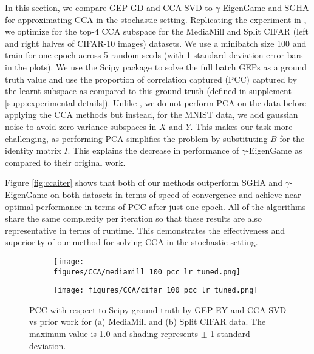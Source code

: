 In this section, we compare GEP-GD and CCA-SVD to $\gamma$-EigenGame \cite{gemp2022generalized} and SGHA \cite{chen2019constrained} for approximating CCA in the stochastic setting. Replicating the experiment in \cite{meng2021online, gemp2022generalized}, we optimize for the top-4 CCA subspace for the MediaMill and Split CIFAR (left and right halves of CIFAR-10 images) datasets. We use a minibatch size 100 and train for one epoch across 5 random seeds (with 1 standard deviation error bars in the plots). We use the Scipy \cite{virtanen2020scipy} package to solve the full batch GEPs as a ground truth value and use the proportion of correlation captured (PCC) captured by the learnt subspace as compared to this ground truth (defined in supplement \ref{supp:experimental details}). Unlike \cite{gemp2022generalized}, we do not perform PCA on the data before applying the CCA methods but instead, for the MNIST data, we add gaussian noise to avoid zero variance subspaces in $X$ and $Y$. This makes our task more challenging, as performing PCA simplifies the problem by substituting $B$ for the identity matrix $I$. This explains the decrease in performance of $\gamma$-EigenGame as compared to their original work.

Figure \ref{fig:ccaiter} shows that both of our methods outperform SGHA and $\gamma$-EigenGame on both datasets in terms of speed of convergence and achieve near-optimal performance in terms of PCC after just one epoch. All of the algorithms share the same complexity per iteration so that these results are also representative in terms of runtime. This demonstrates the effectiveness and superiority of our method for solving CCA in the stochastic setting.

\begin{figure}%
     \centering
     \begin{subfigure}[b]{0.49\textwidth}
         \centering
         \texttt{[image: figures/CCA/mediamill\_100\_pcc\_lr\_tuned.png]}
         \label{fig:ccamediamill}
     \end{subfigure}
     \hfill
     \begin{subfigure}[b]{0.49\textwidth}
         \centering
         \texttt{[image: figures/CCA/cifar\_100\_pcc\_lr\_tuned.png]}
         \label{fig:ccacifar}
     \end{subfigure}
        \caption{PCC with respect to Scipy ground truth by GEP-EY and CCA-SVD vs prior work for (a) MediaMill and (b) Split CIFAR data. The maximum value is 1.0 and shading represents $\pm$ 1 standard deviation.}
        \label{fig:ccaiter}
    \label{fig: stochasticcca}
\end{figure}

